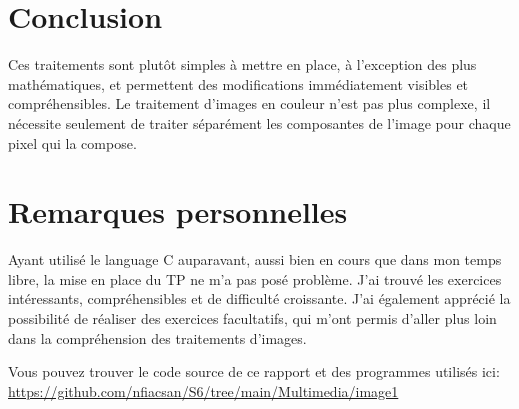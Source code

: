 \documentclass[11pt]{article}
\begin{document}
\FloatBarrier

\clearpage
\section{Conclusion}
Ces traitements sont plutôt simples à mettre en place, à l'exception des plus mathématiques, et permettent des modifications immédiatement visibles et compréhensibles. Le traitement d'images en couleur n'est pas plus complexe, il nécessite seulement de traiter séparément les composantes de l'image pour chaque pixel qui la compose.

\section{Remarques personnelles}
Ayant utilisé le language C auparavant, aussi bien en cours que dans mon temps libre, la mise en place du TP ne m'a pas posé problème. J'ai trouvé les exercices intéressants, compréhensibles et de difficulté croissante. J'ai également apprécié la possibilité de réaliser des exercices facultatifs, qui m'ont permis d'aller plus loin dans la compréhension des traitements d'images.

Vous pouvez trouver le code source de ce rapport et des programmes utilisés ici: \url{https://github.com/nfiacsan/S6/tree/main/Multimedia/image1}
\end{document}
